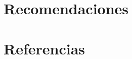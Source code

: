 \documentclass[10pt, letterpaper]{report}
\newcommand{\defaultparformat}[1]{
	{\setlength{\parskip}{2ex}
    }
}
\begin{document}
	\chapter{Recomendaciones}
	\ifdefined\parpordefecto
		\defaultparformat{recomendaciones}
	\else
		
	\fi
\fi

\ifdefined\CAPbibliografia
    \newpage
    \chapter{Referencias}
    \ifdefined\parpordefecto
    \defaultparformat{bibliografia_manual}
    \else
    
    \fi
\fi

\ifdefined\CAPanexos
	\newpage
	\ifdefined\parpordefecto
		\defaultparformat{anexos_A}
	\else
		
	\fi
\fi

\ifdefined\CAPanexos
	\ifdefined\parpordefecto
		\defaultparformat{anexos_B}
	\else
		
	\fi
\fi


\end{document}
